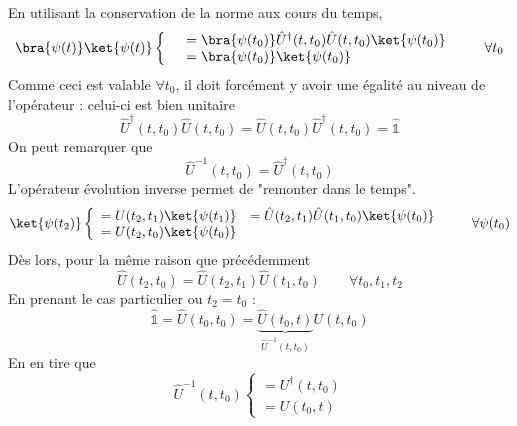 	En utilisant la conservation de la norme aux cours du temps,
	\begin{equation}
	\bra{\psi(t)}\ket{\psi(t)}\left\{\begin{array}{ll}
	&= \bra{\psi(t_0)}\hat{U}^\dagger(t,t_0)\hat{U}(t,t_0)\ket{\psi(t_0)}\\
	&= \bra{\psi(t_0)}\ket{\psi(t_0)}
	\end{array}\right. \qquad\forall t_0
	\end{equation}
	Comme ceci est valable 
	$\forall t_0$, il doit forcément y avoir une égalité au niveau de l'opérateur : celui-ci 
	est bien unitaire
	\begin{equation}
	\hat{U}^\dagger(t,t_0)\hat{U}(t,t_0) = \hat{U}(t,t_0)\hat{U}^\dagger(t,t_0) = \hat{\mathbb{1}}
	\end{equation}
	On peut remarquer que
	\begin{equation}
	\hat{U}^{-1}(t,t_0) = \hat{U}^\dagger(t,t_0)
	\end{equation}
	L'opérateur évolution inverse permet de "remonter dans le temps". 
	\begin{equation}
	\ket{\psi(t_2)} \left\{\begin{array}{ll}
	= U(t_2,t_1)\ket{\psi(t_1)} &= \hat{U}(t_2,t_1)\hat{U}(t_1,t_0)\ket{\psi(t_0)}\\
	= U(t_2,t_0)\ket{\psi(t_0)}
	\end{array}\right.\qquad \forall \psi(t_0)
	\end{equation}
	Dès lors, pour la même raison que précédemment
	\begin{equation}
	\hat U(t_2,t_0) = \hat{U}(t_2,t_1)\hat{U}(t_1,t_0)\qquad \forall t_0,t_1,t_2
	\end{equation}
	En prenant le cas particulier ou $t_2=t_0$ :
	\begin{equation}
	\hat{\mathbb{1}} = \hat{U}(t_0,t_0) = \underbrace{\hat{U}(t_0,t)}_{\hat{U}^{-1}(t,t_0)}U(t,t_0)
	\end{equation}
	En en tire que
	\begin{equation}
	\hat{U}^{-1}(t,t_0) \left\{\begin{array}{ll}
	= U^\dagger (t,t_0)\\
	= U(t_0,t)
	\end{array}\right.
	\end{equation}
	
